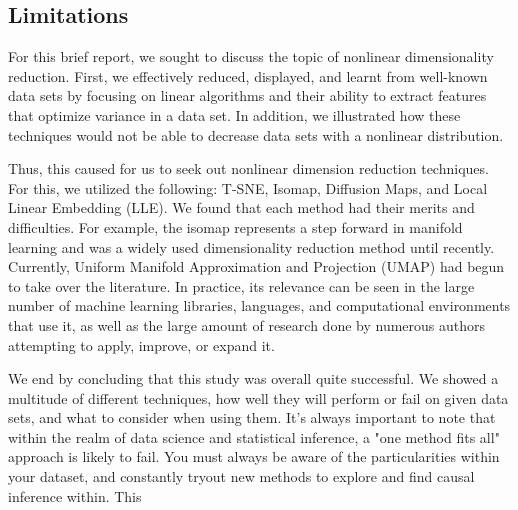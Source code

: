 \documentclass[12pt]{article}
\begin{document}
\subsection{Limitations}
\hspace{5mm}For this brief report, we sought to discuss the topic of nonlinear dimensionality reduction. First, we effectively reduced, displayed, and learnt from well-known data sets by focusing on linear algorithms and their ability to extract features that optimize variance in a data set. In addition, we illustrated how these techniques would not be able to decrease data sets with a nonlinear distribution.

Thus, this caused for us to seek out nonlinear dimension reduction techniques. For this, we utilized the following: T-SNE, Isomap, Diffusion Maps, and Local Linear Embedding (LLE). We found that each method had their merits and difficulties. For example, the isomap represents a step forward in manifold learning and was a widely used dimensionality reduction method until recently. Currently, Uniform Manifold Approximation and Projection (UMAP) had begun to take over the literature. In practice, its relevance can be seen in the large number of machine learning libraries, languages, and computational environments that use it, as well as the large amount of research done by numerous authors attempting to apply, improve, or expand it.

We end by concluding that this study was overall quite successful. We showed a multitude of different techniques, how well they will perform or fail on given data sets, and what to consider when using them. It's always important to note that within the realm of data science and statistical inference, a "one method fits all" approach is likely to fail. You must always be aware of the particularities within your dataset, and constantly tryout new methods to explore and find causal inference within. This 
\end{document}
